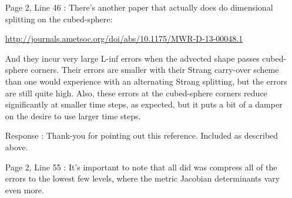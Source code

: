 \documentclass[12pt]{article}
\begin{document}
\begin{enumerate}
\item [Page 2, Line 46]: There's another paper that actually does do dimensional splitting on the cubed-sphere:

\url{http://journals.ametsoc.org/doi/abs/10.1175/MWR-D-13-00048.1}

And they incur very large L-inf errors when the advected shape passes cubed-sphere corners. Their errors are smaller with their Strang carry-over scheme than one would experience with an alternating Strang splitting, but the errors are still quite high. Also, these errors at the cubed-sphere corners reduce significantly at smaller time steps, as expected, but it puts a bit of a damper on the desire to use larger time steps.

\item [Response]: Thank-you for pointing out this reference. Included as described above. 




\item [Page 2, Line 55]: It's important to note that all \cite{SLF+02}  did was compress all of the errors to the lowest few levels, where the metric Jacobian determinants vary even more.


\end{enumerate}
\end{document}
